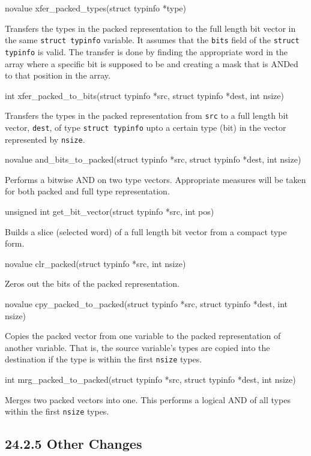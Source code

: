 {\ttfamily\mdseries
novalue xfer\_packed\_types(struct typinfo *type)}

Transfers the types in the packed representation to the full length
bit vector in the same \texttt{struct typinfo} variable. It assumes
that the \texttt{bits} field of the \texttt{struct typinfo} is
valid. The transfer is done by finding the appropriate word in the
array where a specific bit is supposed to be and creating a mask that
is ANDed to that position in the array.

{\ttfamily\mdseries
int xfer\_packed\_to\_bits(struct typinfo *src, struct typinfo *dest, int nsize)}

Transfers the types in the packed representation from \texttt{src} to
a full length bit vector, \texttt{dest}, of type \texttt{struct
typinfo} upto a certain type (bit) in the vector represented by
\texttt{nsize}.

{\ttfamily\mdseries
novalue and\_bits\_to\_packed(struct typinfo *src, struct typinfo *dest, int nsize)}

Performs a bitwise AND on two type vectors. Appropriate measures
will be taken for both packed and full type representation.

{\ttfamily\mdseries
unsigned int get\_bit\_vector(struct typinfo *src, int pos)}

Builds a slice (selected word) of a full length bit vector from a
compact type form.

{\ttfamily\mdseries
novalue clr\_packed(struct typinfo *src, int nsize)}

Zeros out the bits of the packed representation.

{\ttfamily\mdseries
novalue cpy\_packed\_to\_packed(struct typinfo *src, struct typinfo *dest, int nsize)}

Copies the packed vector from one variable to the packed
representation of another variable. That is, the source variable's
types are copied into the destination if the type is within the first
\texttt{nsize} types.

{\ttfamily\mdseries
int mrg\_packed\_to\_packed(struct typinfo *src, struct typinfo *dest, int nsize)}

Merges two packed vectors into one. This performs a logical AND of
all types within the first \texttt{nsize} types.

\subsection[24.2.5 Other Changes]{24.2.5 Other Changes}

